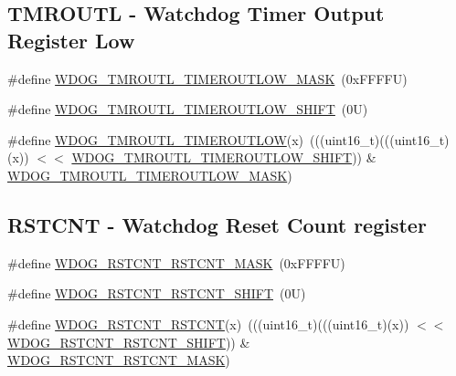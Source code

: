 \subsection*{T\+M\+R\+O\+U\+TL -\/ Watchdog Timer Output Register Low}
\begin{DoxyCompactItemize}
\item 
\#define \mbox{\hyperlink{group___w_d_o_g___register___masks_gaf33faad844e2af36af7af5c6bf49a361}{W\+D\+O\+G\+\_\+\+T\+M\+R\+O\+U\+T\+L\+\_\+\+T\+I\+M\+E\+R\+O\+U\+T\+L\+O\+W\+\_\+\+M\+A\+SK}}~(0x\+F\+F\+F\+F\+U)
\item 
\#define \mbox{\hyperlink{group___w_d_o_g___register___masks_gae4a9f52d3b15e28932d287dee4128e8a}{W\+D\+O\+G\+\_\+\+T\+M\+R\+O\+U\+T\+L\+\_\+\+T\+I\+M\+E\+R\+O\+U\+T\+L\+O\+W\+\_\+\+S\+H\+I\+FT}}~(0\+U)
\item 
\#define \mbox{\hyperlink{group___w_d_o_g___register___masks_gac3d8acaa47ae35b724e29dcd0ed62ac3}{W\+D\+O\+G\+\_\+\+T\+M\+R\+O\+U\+T\+L\+\_\+\+T\+I\+M\+E\+R\+O\+U\+T\+L\+OW}}(x)~(((uint16\+\_\+t)(((uint16\+\_\+t)(x)) $<$$<$ \mbox{\hyperlink{group___w_d_o_g___register___masks_gae4a9f52d3b15e28932d287dee4128e8a}{W\+D\+O\+G\+\_\+\+T\+M\+R\+O\+U\+T\+L\+\_\+\+T\+I\+M\+E\+R\+O\+U\+T\+L\+O\+W\+\_\+\+S\+H\+I\+FT}})) \& \mbox{\hyperlink{group___w_d_o_g___register___masks_gaf33faad844e2af36af7af5c6bf49a361}{W\+D\+O\+G\+\_\+\+T\+M\+R\+O\+U\+T\+L\+\_\+\+T\+I\+M\+E\+R\+O\+U\+T\+L\+O\+W\+\_\+\+M\+A\+SK}})
\end{DoxyCompactItemize}
\subsection*{R\+S\+T\+C\+NT -\/ Watchdog Reset Count register}
\begin{DoxyCompactItemize}
\item 
\#define \mbox{\hyperlink{group___w_d_o_g___register___masks_ga1cb55a509947b315d216ed9d822a4967}{W\+D\+O\+G\+\_\+\+R\+S\+T\+C\+N\+T\+\_\+\+R\+S\+T\+C\+N\+T\+\_\+\+M\+A\+SK}}~(0x\+F\+F\+F\+F\+U)
\item 
\#define \mbox{\hyperlink{group___w_d_o_g___register___masks_gaf2ecbd74ca7b1ba60bc7b89de17b97a6}{W\+D\+O\+G\+\_\+\+R\+S\+T\+C\+N\+T\+\_\+\+R\+S\+T\+C\+N\+T\+\_\+\+S\+H\+I\+FT}}~(0\+U)
\item 
\#define \mbox{\hyperlink{group___w_d_o_g___register___masks_ga7ca7ac27fe2491ac993344daf567aadf}{W\+D\+O\+G\+\_\+\+R\+S\+T\+C\+N\+T\+\_\+\+R\+S\+T\+C\+NT}}(x)~(((uint16\+\_\+t)(((uint16\+\_\+t)(x)) $<$$<$ \mbox{\hyperlink{group___w_d_o_g___register___masks_gaf2ecbd74ca7b1ba60bc7b89de17b97a6}{W\+D\+O\+G\+\_\+\+R\+S\+T\+C\+N\+T\+\_\+\+R\+S\+T\+C\+N\+T\+\_\+\+S\+H\+I\+FT}})) \& \mbox{\hyperlink{group___w_d_o_g___register___masks_ga1cb55a509947b315d216ed9d822a4967}{W\+D\+O\+G\+\_\+\+R\+S\+T\+C\+N\+T\+\_\+\+R\+S\+T\+C\+N\+T\+\_\+\+M\+A\+SK}})
\end{DoxyCompactItemize}
